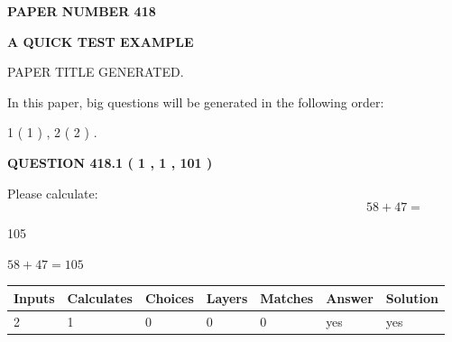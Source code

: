 \documentclass[12pt]{article}
\begin{document}
   
   
   
 {\textbf{ \Large{ PAPER NUMBER  418  }}}
   
   
\vspace{0.2in}
   
   
   
   
   
   
   
   
 \vspace{0.2in}
{\LARGE {\textbf{ A QUICK TEST EXAMPLE}}}
   
   
 PAPER TITLE GENERATED.
   
   
   
\vspace{0.2in}
   
In this paper, big questions will be generated in the following order: 
   
   
   1 ( 1 )
 ,
   2 ( 2 )
 .
  
\vspace{0.2in}
  
{\textbf{\Large{QUESTION
418.1 
 ( 1 , 1 , 101 )
}}}
  
  
 
Please calculate:
\begin{equation}
58 +  %
47 = \nonumber
\end{equation}
 
 
 
\noindent{}
 
 

105
 
 
\noindent{}
 
 

 
 
 
\noindent{}
 
 

$ %
58 +  %
47=   %
105$
 
 
\noindent{}
 
 

 
   
   
   
   
\noindent\begin{tabular}{|l|l|l|l|l|l|l|}
 \hline
Inputs & Calculates & Choices & Layers & Matches & Answer & Solution \\ \hline
 2  & 
 1  & 
 0
  & 
 0  & 
 0  & 
  yes & 
  yes 
  \\ \hline
 \end{tabular}
   
\end{document}
